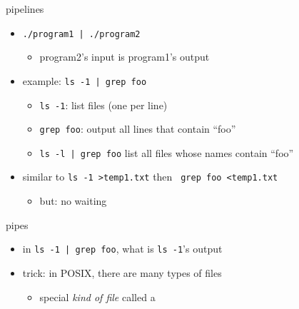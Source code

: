 \begin{frame}[fragile,label=pipelines]{pipelines}
\begin{itemize}
\item \verb!./program1 | ./program2!
    \begin{itemize}
    \item program2's input is program1's output
    \end{itemize}
\item example: \verb!ls -1 | grep foo!
    \begin{itemize}
    \item \verb!ls -1!: list files (one per line)
    \item \verb!grep foo!: output all lines that contain ``foo''
    \item \verb!ls -l | grep foo! list all files whose names contain ``foo''
    \end{itemize}
\item similar to \verb!ls -1 >temp1.txt! then \verb! grep foo <temp1.txt!
\begin{itemize}
\item but: no waiting
\end{itemize}
\end{itemize}
\end{frame}

\begin{frame}[fragile,label=pipeFileTypePreview]{pipes}
\begin{itemize}
\item in \verb!ls -1 | grep foo!, what is \verb!ls -1!'s output
\item trick: in POSIX, there are many types of files
    \begin{itemize}
    \item special \textit{kind of file} called a 
    \end{itemize}
\end{itemize}
\end{frame}
